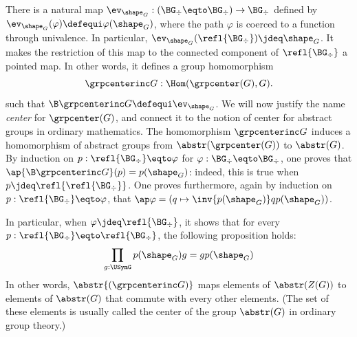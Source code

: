 There is a natural map
$\ev_{\shape_G} : (\BG_\div\eqto\BG_\div) \to \BG_\div$ defined by
$\ev_{\shape_G}(\varphi)\defequi \varphi(\shape_G)$, where the path
$\varphi$ is coerced to a function through univalence. In particular,
$\ev_{\shape_G}(\refl{\BG_\div}) \jdeq \shape_G$. It makes the
restriction of this map to the connected component of
$\refl{\BG_\div}$ a pointed map. In other words, it defines a group
homomorphism
\begin{displaymath}
  \grpcenterinc G : \Hom(\grpcenter(G), G).
\end{displaymath}
such that $\B \grpcenterinc G \defequi \ev_{\shape_G}$. We will now
justify the name {\em center} for $\grpcenter(G)$, and connect it to
the notion of center for abstract groups in ordinary mathematics. The
homomorphism $\grpcenterinc G$ induces a homomorphism of abstract
groups from $\abstr(\grpcenter(G))$ to $\abstr(G)$. By induction on
$p:\refl{\BG_\div} \eqto \varphi$ for
$\varphi:\BG_\div \eqto \BG_\div$, one proves that
$\ap{\B \grpcenterinc G}(p) = p(\shape_G)$: indeed, this is true when
$p\jdeq \refl {\refl{\BG_\div}}$. One proves furthermore, again by
induction on $p:\refl{\BG_\div} \eqto \varphi$, that
$\ap \varphi = (q\mapsto \inv{p(\shape_G)} q p(\shape_G))$.
\begin{marginfigure}
  \caption{}
\end{marginfigure}
In particular, when $\varphi \jdeq \refl{\BG_\div}$, it shows that for
every $p:\refl{\BG_\div}\eqto\refl{\BG_\div}$, the following proposition
holds:
\begin{displaymath}
  \prod_{g:\USymG }p(\shape_G) g = g p(\shape_G)
\end{displaymath}
In other words, $\abstr{(\grpcenterinc G)}$ maps elements of
$\abstr(Z(G))$ to elements of $\abstr(G)$ that commute with every
other elements. (The set of these elements is usually called the
center of the group $\abstr(G)$ in ordinary group theory.)

